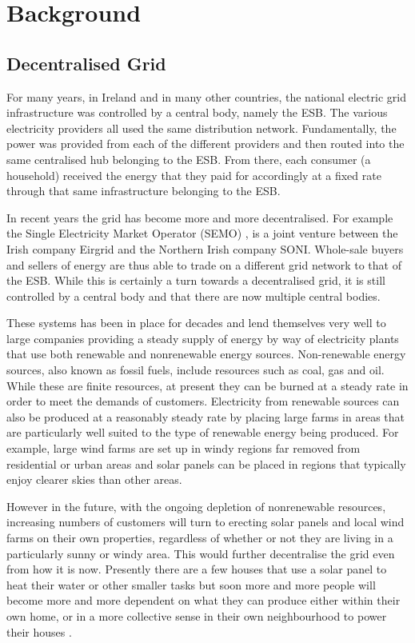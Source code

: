 \documentclass[a4paper, notitlepage]{report}
\begin{document}
\part{Background}
\label{sec:org194cb68}
\chapter{Decentralised Grid}
\label{sec:orge875701}
For many years, in Ireland and in many other countries, the national electric grid
infrastructure was controlled by a central body, namely the ESB. The various
electricity providers all used the same distribution network. Fundamentally, the
power was provided from each of the different providers and then routed into the
same centralised hub belonging to the ESB. From there, each consumer (a
household) received the energy that they paid for accordingly at a fixed rate
through that same infrastructure belonging to the ESB.

In recent years the grid has become more and more decentralised. For example the
Single Electricity Market Operator (SEMO) \cite{semo}, is a joint venture between
the Irish company Eirgrid and the Northern Irish company SONI. Whole-sale buyers
and sellers of energy are thus able to trade on a different grid network to that
of the ESB. While this is certainly a turn towards a decentralised grid, it is
still controlled by a central body and that there are now multiple central
bodies.

These systems has been in place for decades and lend themselves very well to large
companies providing a steady supply of energy by way of electricity plants
that use both renewable and nonrenewable energy sources. Non-renewable energy
sources, also known as fossil fuels, include resources such as coal, gas and
oil. While these are finite resources, at present they can be burned at a steady
rate in order to meet the demands of customers. Electricity from renewable
sources can also be produced at a reasonably steady rate by placing large farms
in areas that are particularly well suited to the type of renewable energy being
produced. For example, large wind farms are set up in windy regions far removed
from residential or urban areas and solar panels can be placed in regions that
typically enjoy clearer skies than other areas.

However in the future, with the ongoing depletion of nonrenewable resources,
increasing numbers of customers will turn to erecting solar panels and local
wind farms on their own properties, regardless of whether or not they are
living in a particularly sunny or windy area. This would further decentralise
the grid even from how it is now. Presently there are a few houses
that use a solar panel to heat their water or other smaller tasks but soon more
and more people will become more and more dependent on what they can produce
either within their own home, or in a more collective sense in their own
neighbourhood to power their houses \cite{apergis2010renewable}.
\end{document}
